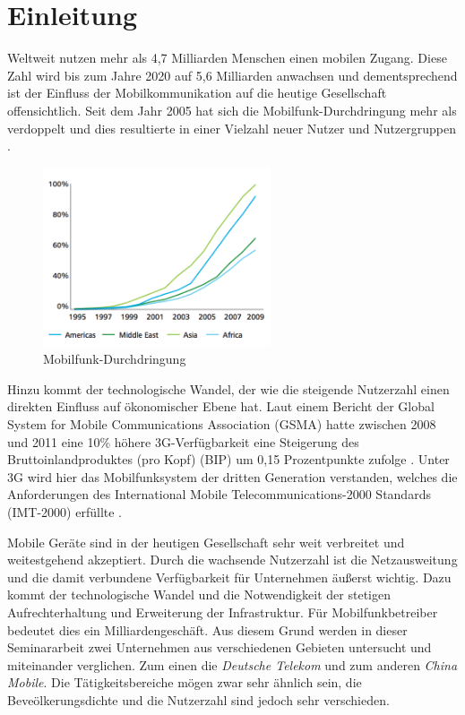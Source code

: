 
\section{Einleitung}

Weltweit nutzen mehr als 4,7 Milliarden Menschen einen mobilen Zugang. Diese Zahl wird bis zum Jahre 2020 auf 5,6 Milliarden anwachsen \cite{gsma2016} und dementsprechend ist der Einfluss der Mobilkommunikation auf die heutige Gesellschaft offensichtlich. Seit dem Jahr 2005 hat sich die Mobilfunk-Durchdringung mehr als verdoppelt und dies resultierte in einer Vielzahl neuer Nutzer und Nutzergruppen \cite{gsma2012}.

\begin{figure}[H]
\centering
\includegraphics[width=0.6\textwidth]{pictures/mobpen.png}
\caption{Mobilfunk-Durchdringung \cite{gsma2012}}
\label{fig:mobpen}
\end{figure}

Hinzu kommt der technologische Wandel, der wie die steigende Nutzerzahl einen direkten Einfluss auf ökonomischer Ebene hat. Laut einem Bericht der Global System for Mobile Communications Association (GSMA) hatte zwischen 2008 und 2011 eine 10\% höhere 3G-Verfügbarkeit eine Steigerung des Bruttoinlandproduktes (pro Kopf) (BIP) um 0,15 Prozentpunkte zufolge \cite{gsma2012}. Unter 3G wird hier das Mobilfunksystem der dritten Generation verstanden, welches die Anforderungen des International Mobile Telecommunications-2000 Standards (IMT-2000) erfüllte \cite{schiller2003mobile}.   

Mobile Geräte sind in der heutigen Gesellschaft sehr weit verbreitet und weitestgehend akzeptiert. Durch die wachsende Nutzerzahl ist die Netzausweitung und die damit verbundene Verfügbarkeit für Unternehmen äußerst wichtig. Dazu kommt der technologische Wandel und die Notwendigkeit der stetigen Aufrechterhaltung und Erweiterung der Infrastruktur. Für Mobilfunkbetreiber bedeutet dies ein Milliardengeschäft. Aus diesem Grund werden in dieser Seminararbeit zwei Unternehmen aus verschiedenen Gebieten untersucht und miteinander verglichen. Zum einen die \textit{Deutsche Telekom} und zum anderen \textit{China Mobile}. Die Tätigkeitsbereiche mögen zwar sehr ähnlich sein, die Beveölkerungsdichte und die Nutzerzahl sind jedoch sehr verschieden. 

